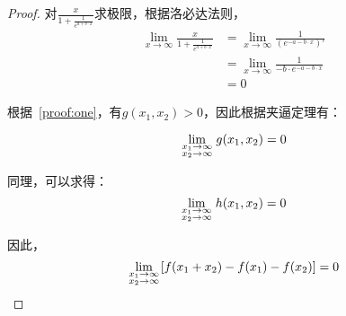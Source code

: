 \begin{proof}
对$\frac{x}{1+\frac{1}{e^{a+b\cdot x}}}$求极限，根据洛必达法则，
\[
\begin{aligned}
\lim_{x \to \infty}\frac{x}{1+\frac{1}{e^{a+b\cdot x}}}&=\lim_{x \to \infty}\frac{1}{(e^{-a-b\cdot x})'}\\
&=\lim_{x \to \infty}\frac{1}{-b\cdot e^{-a-b\cdot x}}\\
&=0
\end{aligned}
\]

根据~\ref{proof:one}，有$g(x_1,x_2)>0$，因此根据夹逼定理有：

\[
\mathop {\lim }\limits_{\scriptstyle x_1 \to \infty  \hfill \atop  \scriptstyle x_2 \to \infty  \hfill}g(x_1,x_2)=0
\]

同理，可以求得：
\[
\mathop {\lim }\limits_{\scriptstyle x_1 \to \infty  \hfill \atop  \scriptstyle x_2 \to \infty  \hfill}h(x_1,x_2)=0
\]

因此，
\[
\mathop {\lim }\limits_{\scriptstyle x_1 \to \infty  \hfill \atop  \scriptstyle x_2 \to \infty  \hfill}[f(x_1+x_2)-f(x_1)-f(x_2)]=0
\]


\end{proof}